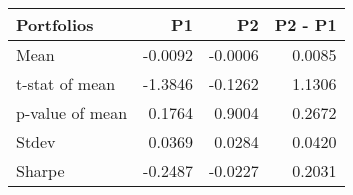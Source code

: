 \begin{tabular}{lrrr}
\toprule
Portfolios & P1 & P2 & P2 - P1 \\
\midrule
Mean & -0.0092 & -0.0006 & 0.0085 \\
t-stat of mean & -1.3846 & -0.1262 & 1.1306 \\
p-value of mean & 0.1764 & 0.9004 & 0.2672 \\
Stdev & 0.0369 & 0.0284 & 0.0420 \\
Sharpe & -0.2487 & -0.0227 & 0.2031 \\
\bottomrule
\end{tabular}
